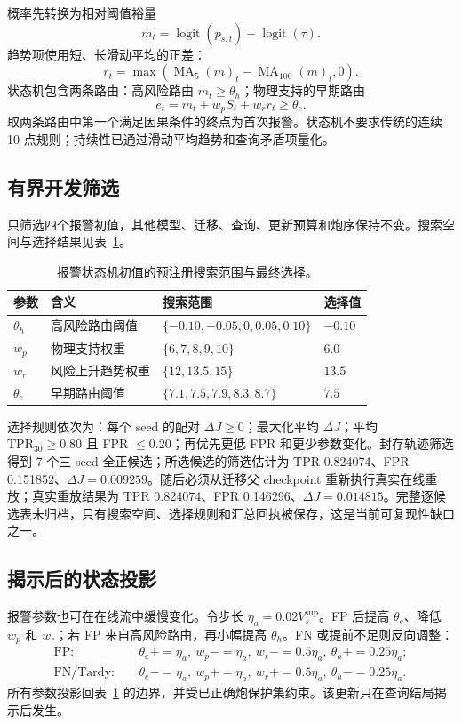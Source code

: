 概率先转换为相对阈值裕量
\[
m_t=\operatorname{logit}(p_{s,t})-\operatorname{logit}(\tau).
\]
趋势项使用短、长滑动平均的正差：
\[
r_t=\max\left(\operatorname{MA}_5(m)_t-\operatorname{MA}_{100}(m)_t,0\right).
\]
状态机包含两条路由：高风险路由 $m_t\ge\theta_h$；物理支持的早期路由
\begin{equation}
e_t=m_t+w_pS_t+w_rr_t\ge\theta_e.
\label{eq:alarm}
\end{equation}
取两条路由中第一个满足因果条件的终点为首次报警。状态机不要求传统的连续 10 点规则；持续性已通过滑动平均趋势和查询矛盾项量化。

\subsection{有界开发筛选}

只筛选四个报警初值，其他模型、迁移、查询、更新预算和炮序保持不变。搜索空间与选择结果见表~\ref{tab:alarm-search}。

\begin{table}[H]
\centering
\caption{报警状态机初值的预注册搜索范围与最终选择。}
\label{tab:alarm-search}
\begin{tabular}{@{}llll@{}}
\toprule
参数 & 含义 & 搜索范围 & 选择值\\
\midrule
$\theta_h$ & 高风险路由阈值 & $\{-0.10,-0.05,0,0.05,0.10\}$ & $-0.10$\\
$w_p$ & 物理支持权重 & $\{6,7,8,9,10\}$ & $6.0$\\
$w_r$ & 风险上升趋势权重 & $\{12,13.5,15\}$ & $13.5$\\
$\theta_e$ & 早期路由阈值 & $\{7.1,7.5,7.9,8.3,8.7\}$ & $7.5$\\
\bottomrule
\end{tabular}
\end{table}

选择规则依次为：每个 seed 的配对 $\Delta J\ge0$；最大化平均 $\Delta J$；平均 $\mathrm{TPR}_{30}\ge0.80$ 且 FPR $\le0.20$；再优先更低 FPR 和更少参数变化。封存轨迹筛选得到 7 个三 seed 全正候选；所选候选的筛选估计为 TPR 0.824074、FPR 0.151852、$\Delta J=0.009259$。随后必须从迁移父 checkpoint 重新执行真实在线重放；真实重放结果为 TPR 0.824074、FPR 0.146296、$\Delta J=0.014815$。完整逐候选表未归档，只有搜索空间、选择规则和汇总回执被保存，这是当前可复现性缺口之一。

\subsection{揭示后的状态投影}

报警参数也可在在线流中缓慢变化。令步长 $\eta_a=0.02V_s^{\mathrm{sup}}$。FP 后提高 $\theta_e$、降低 $w_p$ 和 $w_r$；若 FP 来自高风险路由，再小幅提高 $\theta_h$。FN 或提前不足则反向调整：
\begin{align}
\mathrm{FP}:&\quad \theta_e{+}=\eta_a,\ w_p{-}=\eta_a,\ w_r{-}=0.5\eta_a,\
\theta_h{+}=0.25\eta_a;\\
\mathrm{FN/Tardy}:&\quad \theta_e{-}=\eta_a,\ w_p{+}=\eta_a,\ w_r{+}=0.5\eta_a,\
\theta_h{-}=0.25\eta_a.
\end{align}
所有参数投影回表~\ref{tab:alarm-search} 的边界，并受已正确炮保护集约束。该更新只在查询结局揭示后发生。

